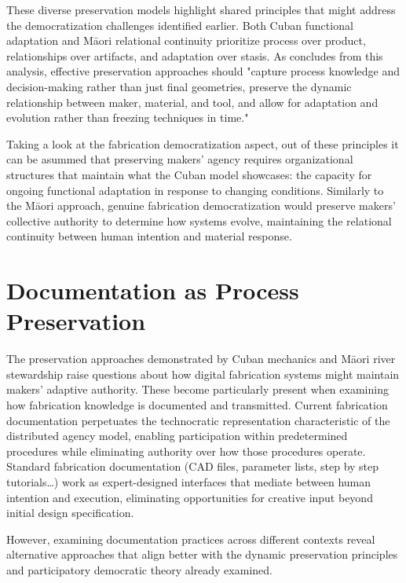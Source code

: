 These diverse preservation models highlight shared principles that might address the democratization challenges identified earlier. Both Cuban functional adaptation and Māori relational continuity prioritize process over product, relationships over artifacts, and adaptation over stasis. As \citet{munoz_zanon_2025} concludes from this analysis, effective preservation approaches should "capture process knowledge and decision-making rather than just final geometries, preserve the dynamic relationship between maker, material, and tool, and allow for adaptation and evolution rather than freezing techniques in time."

\vspace{0.5cm}

Taking a look at the fabrication democratization aspect, out of these principles it can be asummed that preserving makers' agency requires organizational structures that maintain what the Cuban model showcases: the capacity for ongoing functional adaptation in response to changing conditions. Similarly to the Māori approach, genuine fabrication democratization would preserve makers' collective authority to determine how systems evolve, maintaining the relational continuity between human intention and material response.

\section{Documentation as Process Preservation}

The preservation approaches demonstrated by Cuban mechanics and Māori river stewardship raise questions about how digital fabrication systems might maintain makers' adaptive authority. These become particularly present when examining how fabrication knowledge is documented and transmitted. Current fabrication documentation perpetuates the technocratic representation characteristic of the distributed agency model, enabling participation within predetermined procedures while eliminating authority over how those procedures operate. Standard fabrication documentation (CAD files, parameter lists, step by step tutorials\dots) work as expert-designed interfaces that mediate between human intention and execution, eliminating opportunities for creative input beyond initial design specification.

\vspace{0.5cm}

However, examining documentation practices across different contexts reveal alternative approaches that align better with the dynamic preservation principles and participatory democratic theory already examined.

